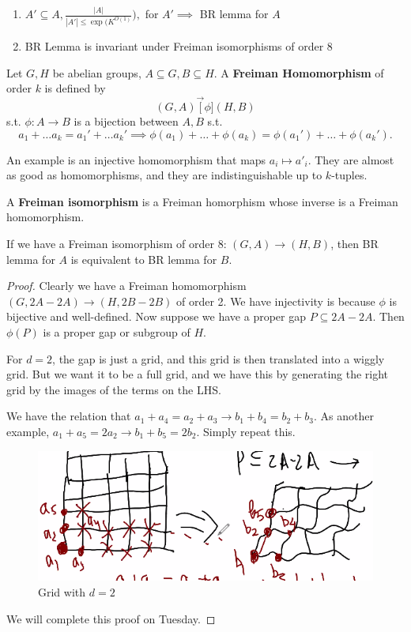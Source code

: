 \documentclass[a4paper]{article}
\begin{document}
\begin{enumerate}
	\item $A' \subseteq A, \frac{|A|}{|A'| \le \exp(K^{O(1)} }) ,$  for $A' \implies $ BR lemma for $A $
	\item BR Lemma is invariant under Freiman isomorphisms of order 8
\end{enumerate}

\begin{definition}
	Let $G,H $ be abelian groups, $A\subseteq G, B\subseteq H $.
	A \textbf{Freiman Homomorphism} of order $k $ is defined by
	\[
		(G,A) \overrightarrow[\phi] (H,B)
	\]
	s.t. $\phi:A\to B $ is a bijection between $A,B $ s.t.
	\[
		a_{1}+\ldots a_k = a_{1}'+\ldots a_k' \implies \phi(a_{1})+\ldots +\phi (a_k) = \phi (a_{1}') + \ldots +\phi (a_k').
	\]
\end{definition}

An example is an injective homomorphism that maps $a_{i} \mapsto a'_i $.
They are almost as good as homomorphisms, and they are indistinguishable up to $k $-tuples.

\begin{definition}
	A \textbf{Freiman isomorphism} is a Freiman homorphism whose inverse is a Freiman homomorphism.
\end{definition}

\begin{prop}
	If we have a Freiman isomorphism of order 8: $(G,A) \to (H,B) $, then BR lemma for $A $ is equivalent to BR lemma for $B $.
\end{prop}
\begin{proof}
	Clearly we have a Freiman homomorphism $(G,2A-2A) \to (H,2B-2B) $ of order 2.
	We have injectivity is because $\phi $ is bijective and well-defined.
	Now suppose we have a proper gap $P\subseteq 2A-2A $.
	Then $\phi(P) $ is a proper gap or subgroup of $H $.

	For $d=2 $, the gap is just a grid, and this grid is then translated into a wiggly grid.
	But we want it to be a full grid, and we have this by generating the right grid by the images of the terms on the LHS.

	We have the relation that $a_{1}+a_{4}=a_{2}+a_{3} \rightarrow b_{1}+b_{4}=b_{2}+b_{3}	$.
	As another example, $a_{1}+a_{5}=2a_{2} \rightarrow b_{1}+b_{5}=2b_{2} $.
	Simply repeat this.
	\begin{figure}[ht]
		\centering
		\includegraphics[width=.25\textwidth]{grid}
		\caption{Grid with $d=2 $ \label{fig:grid}}
	\end{figure}

	We will complete this proof on Tuesday.
\end{proof}
\end{document}
